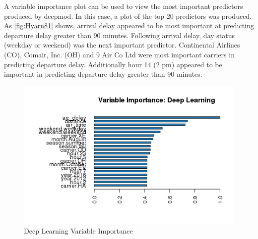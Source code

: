 \documentclass[12pt,twoside]{amherstthesis}
\begin{document}
  \begin{Shaded}
  \begin{Highlighting}[]
  \StringTok{ }\NormalTok{(}\NormalTok{))}
  \StringTok{ }\NormalTok{(}
    \NormalTok{,}
    \NormalTok{,  }
    \NormalTok{,}
     \NormalTok{,}
  \NormalTok{)}
  \end{Highlighting}
  \end{Shaded}
  
  A variable importance plot can be used to view the most important
  predictors produced by deepmod. In this case, a plot of the top 20
  predictors was produced. As \autoref{fig:Hyarn81} shows, arrival delay
  appeared to be most important at predicting departure delay greater than
  90 minutes. Following arrival delay, day status (weekday or weekend) was
  the next important predictor. Continental Airlines (CO), Comair, Inc.
  (OH) and 9 Air Co Ltd were most important carriers in predicting
  departure delay. Additionally hour 14 (2 pm) appeared to be important in
  predicting departure delay greater than 90 minutes.
  
  \begin{Shaded}
  \begin{Highlighting}[]
   \NormalTok{)}
  \end{Highlighting}
  \end{Shaded}
  
  \begin{figure}[htbp]
  \centering
  \includegraphics[scale = 1,angle = 0]{figure/VarImportDeep-3.png}
  \caption[Deep Learning Variable Importance]{\normalsize{Deep Learning Variable Importance}}
  \label{fig:Hyarn81}
  \end{figure}
  
\end{document}
